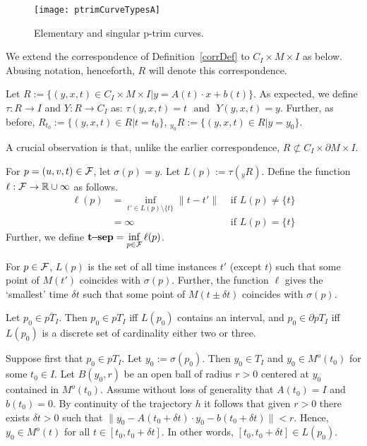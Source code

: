 \documentclass{elsart5p}
\newcommand{\eat}[1]{}
\newcommand{\sep}{{\bf t\!\!-\!\!sep}}
\begin{document}
\begin{figure}
 \centering
 \texttt{[image: ptrimCurveTypesA]}
 \caption{Elementary and singular p-trim curves.}
 \label{ptrimCurveAFig}
\end{figure}

We extend the correspondence of Definition~\ref{corrDef} 
to $C_I \times M \times I$ as below. Abusing notation, henceforth, $R$ will denote this correspondence. 
\eat{
We extend the correspondence defined in Definition~\ref{corrDef} to $C_I \times M \times I$. By abuse of notation, we denote this extended relation again by 
$R$ and the following definition of $R$ will be used in  the rest of the paper.
}
\begin{defn} 
Let 
$R:= \{(y,x,t) \in C_I \times M \times I| y = A(t) \cdot x + b(t) \}$.
As expected, we define $\tau: R \to I$ 
and $Y: R \to C_I$ as:
$\tau(y,x,t) = t \mbox{~~and~~} Y(y,x,t) = y$.
Further, as before,
$R_{t_0} := \{(y,x,t) \in R | t = t_0  \}$,\!
${_{y_0}}\!R := \{(y,x,t) \in R |  y = y_0 \}$.
\end{defn}

A crucial observation is that, unlike the earlier correspondence, {\em $R \not\subset C_I \times \partial M \times I$}.

\begin{defn} \label{lDef}
For $p=(u,v,t) \in {\cal F}$, let $\sigma(p) = y$. Let $L(p) := \tau({_y}R)$. Define the function 
$\ell: {\cal F} \to \mathbb{R} \cup \infty$ as follows.
\begin{align*}
\ell(p) &= \displaystyle \inf_{t' \in L(p)\setminus\{t\} } \|t - t'\|  &\text{ if } L(p) \neq \{t\} \\
	&= \infty  &\text{ if } L(p) = \{t\}
\end{align*}
Further, we define $\sep = \displaystyle \inf_{p \in{\cal F}} \ell(p)$.
\end{defn}

For $p \in {\cal F}$, $L(p)$ is the set of all time instances $t'$ (except $t$) such 
that some point of $M(t')$ coincides with $\sigma(p)$. 
Further, the function $\ell$ gives the `smallest' 
time $\delta t$ such that some point of $M(t \pm \delta t)$ coincides with $\sigma(p)$.

\begin{lem} \label{trimCLem}
Let $p_0 \in \overline{pT_I}$. Then  $ p_0 \in pT_I$ iff $L(p_0)$ contains an interval, and $p_0 \in \partial pT_I$ iff $L(p_0)$ is a discrete set
of cardinality either two or three.
\end{lem}
 Suppose first that $p_0 \in pT_I$.  Let $y_0 := \sigma(p_0)$.  Then $y_0 \in T_I$ and 
$y_0 \in M^o(t_0)$ for some $t_0 \in I$.  Let $B(y_0, r)$ be an open ball of radius $r >0$ centered at 
$y_0$ contained in $M^o(t_0)$.  Assume without loss of generality that $A(t_0) = I$ and $b(t_0) = 0$. 
By continuity of the trajectory $h$ it follows that given $r>0$ there exists $\delta t > 0$ such that 
$\| y_0 - A(t_0+\delta t) \cdot y_0 - b(t_0 +\delta t) \| < r$.  Hence, $y_0 \in M^o(t)$ for all 
$t \in [t_0, t_0 + \delta t]$.  In other words, $[t_0, t_0 + \delta t] \in L(p_0)$.
\end{document}
